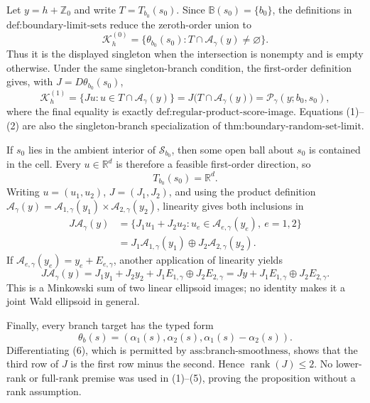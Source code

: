 Let \(y=h+\mathbb Z_0\) and write \(T=T_{b_0}(s_0)\).  Since \(\mathbb B(s_0)=\{b_0\}\), the definitions in \(\text{def:boundary-limit-sets}\) reduce the zeroth-order union to
\[
 \mathcal K_h^{(0)}
 =\{\theta_{b_0}(s_0):T\cap\mathcal A_\gamma(y)\ne\varnothing\}.
 \tag{1}
\]
Thus it is the displayed singleton when the intersection is nonempty and is empty otherwise.  Under the same singleton-branch condition, the first-order definition gives, with \(J=D\theta_{b_0}(s_0)\),
\[
 \mathcal K_h^{(1)}
 =\{Ju:u\in T\cap\mathcal A_\gamma(y)\}
 =J\bigl(T\cap\mathcal A_\gamma(y)\bigr)
 =\mathcal P_\gamma(y;b_0,s_0),
 \tag{2}
\]
where the final equality is exactly \(\text{def:regular-product-score-image}\).  Equations (1)--(2) are also the singleton-branch specialization of \(\text{thm:boundary-random-set-limit}\).

If \(s_0\) lies in the ambient interior of \(\mathcal S_{b_0}\), then some open ball about \(s_0\) is contained in the cell.  Every \(u\in\mathbb R^d\) is therefore a feasible first-order direction, so
\[
 T_{b_0}(s_0)=\mathbb R^d.
 \tag{3}
\]
Writing \(u=(u_1,u_2)\), \(J=(J_1,J_2)\), and using the product definition \(\mathcal A_\gamma(y)=\mathcal A_{1,\gamma}(y_1)\times\mathcal A_{2,\gamma}(y_2)\), linearity gives both inclusions in
\[
 \begin{aligned}
 J\mathcal A_\gamma(y)
 &=\{J_1u_1+J_2u_2:
       u_e\in\mathcal A_{e,\gamma}(y_e),\ e=1,2\}\\
 &=J_1\mathcal A_{1,\gamma}(y_1)
   \oplus J_2\mathcal A_{2,\gamma}(y_2).
 \end{aligned}
 \tag{4}
\]
If \(\mathcal A_{e,\gamma}(y_e)=y_e+E_{e,\gamma}\), another application of linearity yields
\[
 J\mathcal A_\gamma(y)
 =J_1y_1+J_2y_2+J_1E_{1,\gamma}\oplus J_2E_{2,\gamma}
 =Jy+J_1E_{1,\gamma}\oplus J_2E_{2,\gamma}.
 \tag{5}
\]
This is a Minkowski sum of two linear ellipsoid images; no identity makes it a joint Wald ellipsoid in general.

Finally, every branch target has the typed form
\[
 \theta_b(s)=(\alpha_1(s),\alpha_2(s),
                    \alpha_1(s)-\alpha_2(s)).
 \tag{6}
\]
Differentiating (6), which is permitted by \(\text{ass:branch-smoothness}\), shows that the third row of \(J\) is the first row minus the second.  Hence \(\operatorname{rank}(J)\le2\).  No lower-rank or full-rank premise was used in (1)--(5), proving the proposition without a rank assumption.